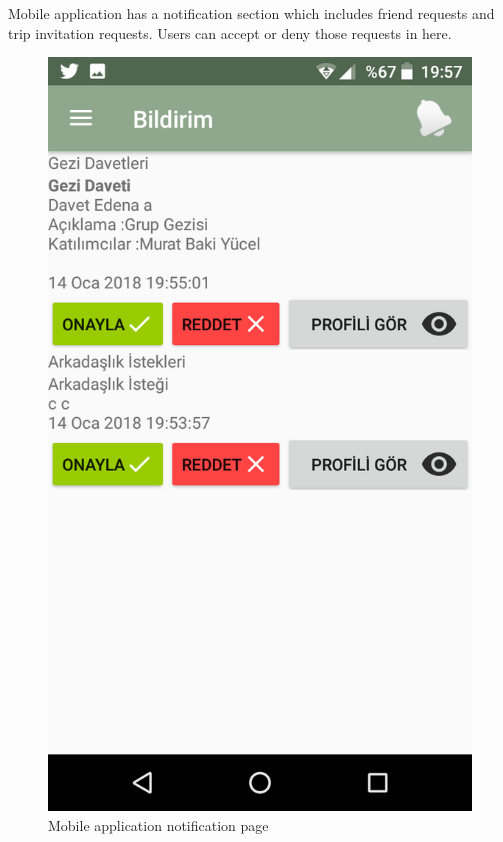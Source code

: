 \newpage

Mobile application has a notification section which includes friend requests and trip invitation requests. Users can accept or deny those requests in here.

\begin{figure}[!htbp]
\centering
\includegraphics[scale=0.2]{projectChapters/images/notificationMobile.png}
\caption{Mobile application notification page}
\label{fig:notificationMobile}
\end{figure}

